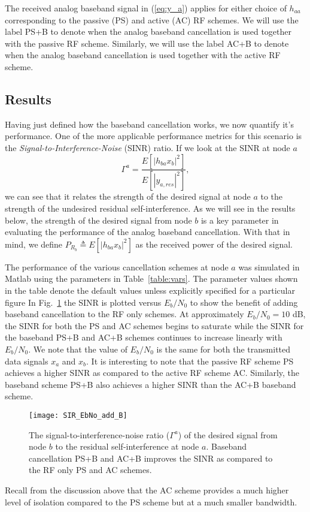 \documentclass[12pt, journal,draftcls,letterpaper,onecolumn]{IEEEtran}
\begin{document}
The received analog baseband signal in (\ref{eq:y_a}) applies for either choice of $h_{aa}$ corresponding to the passive (PS) and active (AC) RF schemes.  We will use the label PS+B to denote when the analog baseband cancellation is used together with the passive RF scheme.  Similarly, we will use the label AC+B to denote when the analog baseband cancellation is used together with the active RF scheme.  

\subsection{Results}
Having just defined how the baseband cancellation works, we now quantify it's performance.  One of the more applicable performance metrics for this scenario is the \emph{Signal-to-Interference-Noise} (SINR) ratio.  If we look at the SINR at node $a$
\begin{equation}
\Gamma^a = \dfrac{E[|h_{ba}x_b|^2]}{E[|y_{a,res}|^2]},
\end{equation}
we can see that it relates the strength of the desired signal at node $a$ to the strength of the undesired residual self-interference.  As we will see in the results below, the strength of the desired signal from node $b$ is a key parameter in evaluating the performance of the analog baseband cancellation.  With that in mind, we define $P_{R_b} \triangleq E[|h_{ba}x_b|^2]$ as the received power of the desired signal.  


The performance of the various cancellation schemes at node $a$ was simulated in Matlab using the parameters in Table~\ref{table:vars}. The parameter values shown in the table denote the default values unless explicitly specified for a particular figure  In Fig.~\ref{fig:SIR_add_B} the SINR is plotted versus $E_b/N_0$ to show the benefit of adding baseband cancellation to the RF only schemes.  At approximately $E_b/N_0 = 10$ dB, the SINR for both the PS and AC schemes begins to saturate while the SINR for the baseband PS+B and AC+B schemes continues to increase linearly with $E_b/N_0$.  We note that the value of $E_b/N_0$ is the same for both the transmitted data signals $x_a$ and $x_b$.  It is interesting to note that the passive RF scheme PS achieves a higher SINR as compared to the active RF scheme AC.  Similarly, the baseband scheme PS+B also achieves a higher SINR than the AC+B baseband scheme.  
\begin{figure}[htp]
\begin{center} 
  \texttt{[image: SIR\_EbNo\_add\_B]}
\caption[fig:chan_ang]{The signal-to-interference-noise ratio ($\Gamma^a$) of the desired signal from node $b$ to the residual self-interference at node $a$.  Baseband cancellation PS+B and AC+B improves the SINR as compared to the RF only PS and AC schemes.} 
  \label{fig:SIR_add_B}
\end{center} 
\end{figure} 
Recall from the discussion above that the AC scheme provides a much higher level of isolation compared to the PS scheme but at a much smaller bandwidth.  
\end{document}
